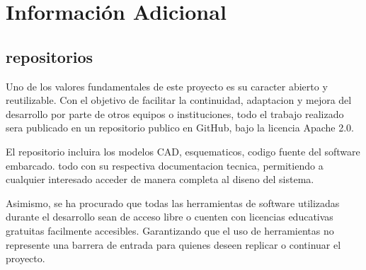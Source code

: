 \chapter{Información Adicional}

\section{repositorios}

Uno de los valores fundamentales de este proyecto es su caracter abierto y reutilizable.
Con el objetivo de facilitar la continuidad, adaptacion y mejora del desarrollo por parte
de otros equipos o instituciones, todo el trabajo realizado sera publicado en un repositorio
publico en GitHub, bajo la licencia Apache 2.0.

El repositorio incluira los modelos CAD, esquematicos, codigo fuente del software
embarcado. todo con su respectiva documentacion tecnica, permitiendo a cualquier interesado
acceder de manera completa al diseno del sistema.

Asimismo, se ha procurado que todas las herramientas de software utilizadas durante
el desarrollo sean de acceso libre o cuenten con licencias educativas gratuitas facilmente
accesibles. Garantizando que el uso de herramientas no represente una barrera de
entrada para quienes deseen replicar o continuar el proyecto.
